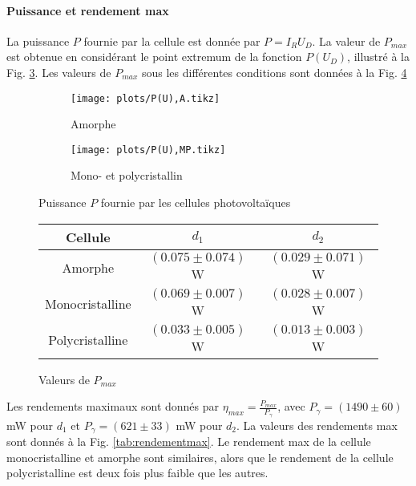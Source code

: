 \paragraph*{Puissance et rendement max}
La puissance \(P\) fournie par la cellule est donnée par \(P = I_R U_D\). La valeur de \(P_{max}\) est obtenue en considérant le point extremum de la fonction \(P(U_D)\), illustré à la Fig. \ref{plot:3}. Les valeurs de \(P_{max}\) sous les différentes conditions sont données à la Fig. \ref{tab:pmax}

\begin{figure}[h]
    \centering
    \begin{subfigure}[c]{0.45\linewidth}
        \centering
        \texttt{[image: plots/P(U),A.tikz]}
        \caption{Amorphe}
        \label{plot:3a}        
    \end{subfigure}
    \begin{subfigure}[c]{0.45\linewidth}
        \centering
        \texttt{[image: plots/P(U),MP.tikz]}
        \caption{Mono- et polycristallin}
        \label{plot:3b}        
    \end{subfigure}
    \caption{Puissance \(P\) fournie par les cellules photovoltaïques}
    \label{plot:3}
\end{figure}

\begin{figure}[h]
    \centering
    \begin{tabulary}{0.7\linewidth}{C C C}
        \toprule
        Cellule & \(d_1\) & \(d_2\) \\
        \midrule
        Amorphe & \((0.075 \pm 0.074)\) \unit{\watt} & \((0.029 \pm 0.071)\) \unit{\watt} \\
        Monocristalline & \((0.069 \pm 0.007)\) \unit{\watt} & \((0.028 \pm 0.007)\) \unit{\watt} \\
        Polycristalline & \((0.033 \pm 0.005)\) \unit{\watt} & \((0.013 \pm 0.003)\) \unit{\watt} \\
        \bottomrule
    \end{tabulary}
    \caption{Valeurs de \(P_{max}\)}
    \label{tab:pmax}
\end{figure}

Les rendements maximaux sont donnés par \(\eta_{max} = \frac{P_{max}}{P_\gamma}\), avec \(P_\gamma = (1490 \pm 60)\) \unit{\milli\watt} pour \(d_1\) et \(P_\gamma = (621 \pm 33)\) \unit{\milli\watt} pour \(d_2\). La valeurs des rendements max sont donnés à la Fig. \ref{tab:rendementmax}. Le rendement max de la cellule monocristalline et amorphe sont similaires, alors que le rendement de la cellule polycristalline est deux fois plus faible que les autres.

